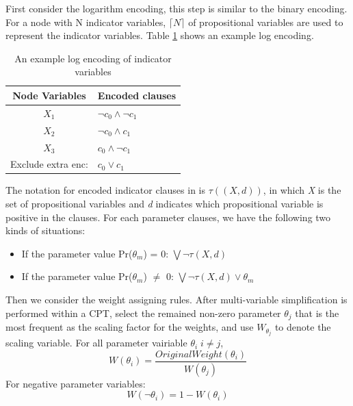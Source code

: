         \noindent First consider the logarithm encoding, this step is similar to the binary encoding. For a node with N indicator variables, $\lceil N \rceil$ of propositional variables are used to represent the indicator variables. Table \ref{tab:log_example} shows an example log encoding.\\
        \begin{table}[]
            \centering
            \begin{tabular}{c l}
                \hline
                \hline
                Node Variables	&	Encoded clauses	\\
                \hline
                $X_{1}$	&	$\neg c_{0} \wedge \neg c_{1}$	\\
                $X_{2}$	&	$\neg c_{0} \wedge c_{1}$	\\
                $X_{3}$	&	$ c_{0} \wedge \neg c_{1}$	\\
                \hline
                Exclude extra enc: & $c_{0} \vee  c_{1}$\\
                \hline
                \hline
            \end{tabular}
            \caption{An example log encoding of indicator variables}
            \label{tab:log_example}
        \end{table}
        
        \noindent The notation for encoded indicator clauses in \cite{2016-logencoding} is $\tau((X, d))$, in which \textit{X} is the set of propositional variables and \textit{d} indicates which propositional variable is positive in the clauses. For each parameter clauses, we have the following two kinds of situations:
        
        \begin{itemize}
            \item If the parameter value Pr($\theta_{m}$) = 0: $\bigvee \neg \tau(X, d)$ 
            \item If the parameter value Pr($\theta_{m}$) $\neq$ 0: $\bigvee \neg \tau(X, d) \vee \theta_{m}$ 
        \end{itemize}
        
        Then we consider the weight assigning rules. After multi-variable simplification is performed within a CPT, select the remained non-zero parameter $\theta_{j}$ that is the most frequent as the scaling factor for the weights, and use $W_{\theta_{j}}$ to denote the scaling variable. For all parameter vairiable $\theta_{i}\; i \neq j$, 
        $$W(\theta_{i}) = \frac{OriginalWeight(\theta_{i})}{W(\theta_{j})}$$
        For negative parameter variables:
        $$W(\neg \theta_{i}) = 1 - W(\theta_{i})$$


